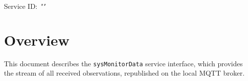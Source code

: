 \documentclass[a4paper]{arrowhead}
\begin{document}
\sloppy

\ArrowheadSetup

\begin{center}
  \vspace*{1cm}
  \huge{\arrowtitle}

  \vspace*{0.2cm}
  \LARGE{\arrowtype}
  \vspace*{1cm}

  \Large{Service ID: \textit{"\arrowid"}}

  \vspace*{\fill}


  \vspace*{1cm}
  \vspace*{\fill}

  \begin{abstract}
    This document describes the MQTT protocol with TLS payload security and JSON payload encoding variant of the \texttt{sysMonitorData} service of the SysMonitor support system (SysMonitor-Data-MQTT-IDD-5.2.2).
  \end{abstract}

  \vspace*{1cm}
\end{center}

\newpage

\tableofcontents
\newpage

\section{Overview}
\label{sec:overview}

This document describes the \texttt{sysMonitorData} service interface, which provides the stream of all received observations, republished on the local MQTT broker.
\end{document}
